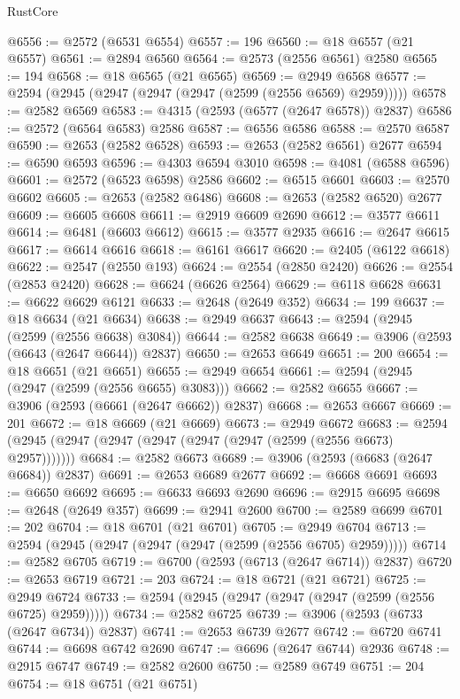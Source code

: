 \begin{lexlean}{RustCore}
\begin{coremodule}
@6556 := @2572 (@6531 @6554)
@6557 := 196
@6560 := @18 @6557 (@21 @6557)
@6561 := @2894 @6560
@6564 := @2573 (@2556 @6561) @2580
@6565 := 194
@6568 := @18 @6565 (@21 @6565)
@6569 := @2949 @6568
@6577 := @2594 (@2945 (@2947 (@2947 (@2947 (@2599 (@2556 @6569) @2959)))))
@6578 := @2582 @6569
@6583 := @4315 (@2593 (@6577 (@2647 @6578)) @2837)
@6586 := @2572 (@6564 @6583) @2586
@6587 := @6556 @6586
@6588 := @2570 @6587
@6590 := @2653 (@2582 @6528)
@6593 := @2653 (@2582 @6561) @2677
@6594 := @6590 @6593
@6596 := @4303 @6594 @3010
@6598 := @4081 (@6588 @6596)
@6601 := @2572 (@6523 @6598) @2586
@6602 := @6515 @6601
@6603 := @2570 @6602
@6605 := @2653 (@2582 @6486)
@6608 := @2653 (@2582 @6520) @2677
@6609 := @6605 @6608
@6611 := @2919 @6609 @2690
@6612 := @3577 @6611
@6614 := @6481 (@6603 @6612)
@6615 := @3577 @2935
@6616 := @2647 @6615
@6617 := @6614 @6616
@6618 := @6161 @6617
@6620 := @2405 (@6122 @6618)
@6622 := @2547 (@2550 @193)
@6624 := @2554 (@2850 @2420)
@6626 := @2554 (@2853 @2420)
@6628 := @6624 (@6626 @2564)
@6629 := @6118 @6628
@6631 := @6622 @6629 @6121
@6633 := @2648 (@2649 @352)
@6634 := 199
@6637 := @18 @6634 (@21 @6634)
@6638 := @2949 @6637
@6643 := @2594 (@2945 (@2599 (@2556 @6638) @3084))
@6644 := @2582 @6638
@6649 := @3906 (@2593 (@6643 (@2647 @6644)) @2837)
@6650 := @2653 @6649
@6651 := 200
@6654 := @18 @6651 (@21 @6651)
@6655 := @2949 @6654
@6661 := @2594 (@2945 (@2947 (@2599 (@2556 @6655) @3083)))
@6662 := @2582 @6655
@6667 := @3906 (@2593 (@6661 (@2647 @6662)) @2837)
@6668 := @2653 @6667
@6669 := 201
@6672 := @18 @6669 (@21 @6669)
@6673 := @2949 @6672
@6683 := @2594 (@2945 (@2947 (@2947 (@2947 (@2947 (@2947 (@2599 (@2556 @6673) @2957)))))))
@6684 := @2582 @6673
@6689 := @3906 (@2593 (@6683 (@2647 @6684)) @2837)
@6691 := @2653 @6689 @2677
@6692 := @6668 @6691
@6693 := @6650 @6692
@6695 := @6633 @6693 @2690
@6696 := @2915 @6695
@6698 := @2648 (@2649 @357)
@6699 := @2941 @2600
@6700 := @2589 @6699
@6701 := 202
@6704 := @18 @6701 (@21 @6701)
@6705 := @2949 @6704
@6713 := @2594 (@2945 (@2947 (@2947 (@2947 (@2599 (@2556 @6705) @2959)))))
@6714 := @2582 @6705
@6719 := @6700 (@2593 (@6713 (@2647 @6714)) @2837)
@6720 := @2653 @6719
@6721 := 203
@6724 := @18 @6721 (@21 @6721)
@6725 := @2949 @6724
@6733 := @2594 (@2945 (@2947 (@2947 (@2947 (@2599 (@2556 @6725) @2959)))))
@6734 := @2582 @6725
@6739 := @3906 (@2593 (@6733 (@2647 @6734)) @2837)
@6741 := @2653 @6739 @2677
@6742 := @6720 @6741
@6744 := @6698 @6742 @2690
@6747 := @6696 (@2647 @6744) @2936
@6748 := @2915 @6747
@6749 := @2582 @2600
@6750 := @2589 @6749
@6751 := 204
@6754 := @18 @6751 (@21 @6751)

\end{coremodule}
\end{lexlean}
